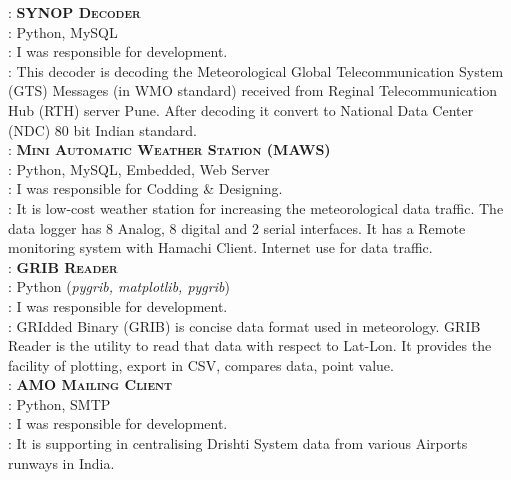 \documentclass[a4paper,11pt]{memoir} %
\begin{document}
\begin{minipage}[t]{0.75\columnwidth}
: \textbf{\textsc{SYNOP Decoder}}\\
: Python, MySQL\\
: I was responsible for development.\\
: This decoder is decoding the Meteorological Global Telecommunication System (GTS) 
Messages (in WMO standard) received from Reginal Telecommunication Hub (RTH)  
server Pune. After decoding it convert to National Data Center (NDC) 80 bit Indian standard. \\

: \textbf{\textsc{Mini Automatic Weather Station} (MAWS)}\\
: Python, MySQL, Embedded, Web Server \\
: I was responsible for Codding \& Designing.\\
: It is low-cost weather station for increasing the meteorological data traffic. 
The data logger has 8 Analog, 8 digital and 2 serial interfaces. 
It has a Remote monitoring system with Hamachi Client. 
Internet use for data traffic.\\

: \textbf{\textsc{GRIB Reader}}\\
: Python (\textit{pygrib, matplotlib, pygrib})\\
: I was responsible for development.\\
: GRIdded Binary (GRIB) is concise data format used in meteorology. 
GRIB Reader is the utility to read that data with respect to Lat-Lon.
It provides the facility of plotting, export in CSV, compares data, point value.
\\

: \textbf{\textsc{AMO Mailing Client}}\\
: Python, SMTP\\
: I was responsible for development.\\
: It is supporting in centralising Drishti  System data from various Airports runways in India.

\end{minipage}



\clearpage %
\userinformation %
\framebreak %
\end{document}
